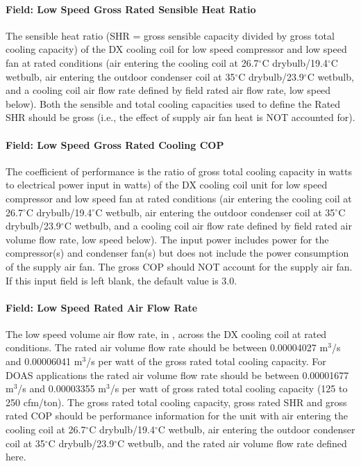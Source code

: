 \paragraph{Field: Low Speed Gross Rated Sensible Heat Ratio}\label{field-low-speed-gross-rated-sensible-heat-ratio}

The sensible heat ratio (SHR = gross sensible capacity divided by gross total cooling capacity) of the DX cooling coil for low speed compressor and low speed fan at rated conditions (air entering the cooling coil at 26.7$^\circ$C drybulb/19.4$^\circ$C wetbulb, air entering the outdoor condenser coil at 35$^\circ$C drybulb/23.9$^\circ$C wetbulb, and a cooling coil air flow rate defined by field rated air flow rate, low speed below). Both the sensible and total cooling capacities used to define the Rated SHR should be gross (i.e., the effect of supply air fan heat is NOT accounted for).

\paragraph{Field: Low Speed Gross Rated Cooling COP}\label{field-low-speed-gross-rated-cooling-cop}

The coefficient of performance is the ratio of gross total cooling capacity in watts to electrical power input in watts) of the DX cooling coil unit for low speed compressor and low speed fan at rated conditions (air entering the cooling coil at 26.7$^\circ$C drybulb/19.4$^\circ$C wetbulb, air entering the outdoor condenser coil at 35$^\circ$C drybulb/23.9$^\circ$C wetbulb, and a cooling coil air flow rate defined by field rated air volume flow rate, low speed below). The input power includes power for the compressor(s) and condenser fan(s) but does not include the power consumption of the supply air fan. The gross COP should NOT account for the supply air fan. If this input field is left blank, the default value is 3.0.

\paragraph{Field: Low Speed Rated Air Flow Rate}\label{field-low-speed-rated-air-flow-rate}

The low speed volume air flow rate, in \si{\volumeFlowRate}, across the DX cooling coil at rated conditions. The rated air volume flow rate should be between 0.00004027 m\(^{3}\)/s and 0.00006041 m\(^{3}\)/s per watt of the gross rated total cooling capacity. For DOAS applications the rated air volume flow rate should be between 0.00001677 m\(^{3}\)/s and 0.00003355 m\(^{3}\)/s per watt of gross rated total cooling capacity (125 to 250 cfm/ton). The gross rated total cooling capacity, gross rated SHR and gross rated COP should be performance information for the unit with air entering the cooling coil at 26.7$^\circ$C drybulb/19.4$^\circ$C wetbulb, air entering the outdoor condenser coil at 35$^\circ$C drybulb/23.9$^\circ$C wetbulb, and the rated air volume flow rate defined here.

